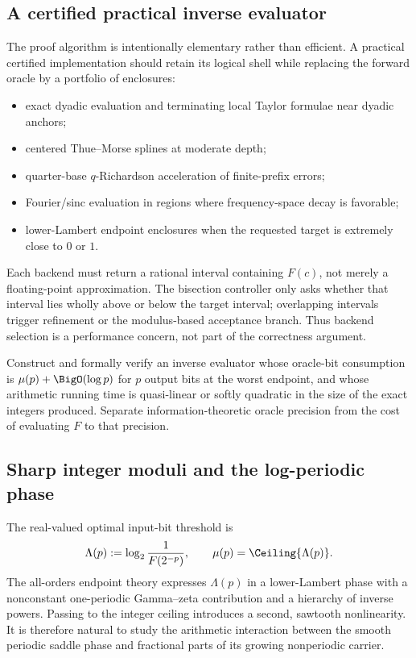 \subsection{A certified practical inverse evaluator}

The proof algorithm is intentionally elementary rather than efficient.  A
practical certified implementation should retain its logical shell while
replacing the forward oracle by a portfolio of enclosures:

\begin{itemize}
\item exact dyadic evaluation and terminating local Taylor formulae near
      dyadic anchors;
\item centered Thue--Morse splines at moderate depth;
\item quarter-base $q$-Richardson acceleration of finite-prefix errors;
\item Fourier/sinc evaluation in regions where frequency-space decay is
      favorable;
\item lower-Lambert endpoint enclosures when the requested target is extremely
      close to $0$ or $1$.
\end{itemize}

Each backend must return a rational interval containing $F(c)$, not merely a
floating-point approximation.  The bisection controller only asks whether
that interval lies wholly above or below the target interval; overlapping
intervals trigger refinement or the modulus-based acceptance branch.  Thus
backend selection is a performance concern, not part of the correctness
argument.

\begin{problem}
\label{comp:prob:near-optimal-evaluation}
Construct and formally verify an inverse evaluator whose oracle-bit
consumption is $\mu(p)+\BigO(\log p)$ for $p$ output bits at the worst endpoint,
and whose arithmetic running time is quasi-linear or softly quadratic in the
size of the exact integers produced.  Separate information-theoretic oracle
precision from the cost of evaluating $F$ to that precision.
\end{problem}

\subsection{Sharp integer moduli and the log-periodic phase}

The real-valued optimal input-bit threshold is
\[
 \Lambda(p):=\log_2\frac1{F(2^{-p})},
 \qquad \mu(p)=\Ceiling{\Lambda(p)}.
\]
The all-orders endpoint theory expresses $\Lambda(p)$ in a lower-Lambert
phase with a nonconstant one-periodic Gamma--zeta contribution and a hierarchy
of inverse powers.  Passing to the integer ceiling introduces a second,
sawtooth nonlinearity.  It is therefore natural to study the arithmetic
interaction between the smooth periodic saddle phase and fractional parts of
its growing nonperiodic carrier.

